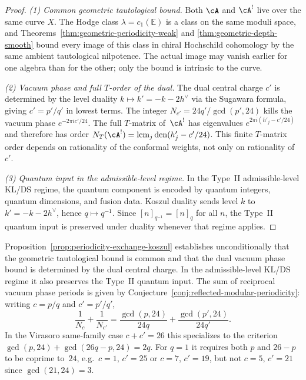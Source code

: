 \begin{proof}
\emph{(1) Common geometric tautological bound.}
Both $\cA$ and $\cA^!$ live over the same curve $X$. The Hodge class
$\lambda=c_1(\mathbb E)$ is a class on the same moduli space, and
Theorems~\ref{thm:geometric-periodicity-weak} and
\ref{thm:geometric-depth-smooth} bound every image of this class in
chiral Hochschild cohomology by the same ambient tautological
nilpotence. The actual image may vanish earlier for one algebra than
for the other; only the bound is intrinsic to the curve.

\emph{(2) Vacuum phase and full $T$-order of the dual.}
The dual central charge $c'$ is determined by the level duality
$k \mapsto k' = -k - 2h^\vee$ via the Sugawara formula, giving
$c'=p'/q'$ in lowest terms. The integer
$N_{c'}=24q'/\gcd(p',24)$ kills the vacuum phase
$e^{-2\pi i c'/24}$. The full $T$-matrix of~$\cA^!$ has eigenvalues
$e^{2\pi i(h'_j-c'/24)}$ and therefore has order
$N_T(\cA^!)=\operatorname{lcm}_j\operatorname{den}(h'_j-c'/24)$.
This finite $T$-matrix order depends on rationality of the conformal
weights, not only on rationality of~$c'$.

\emph{(3) Quantum input in the admissible-level regime.}
In the Type~II admissible-level KL/DS regime, the quantum component is
encoded by quantum integers, quantum dimensions, and fusion data.
Koszul duality sends level $k$ to $k' = -k - 2h^\vee$, hence
$q \mapsto q^{-1}$. Since $[n]_{q^{-1}} = [n]_q$ for all $n$, the
Type~II quantum input is preserved under duality whenever that regime
applies.
\end{proof}

\begin{remark}\label{rem:periodicity-exchange-harmonic}
Proposition~\ref{prop:periodicity-exchange-koszul} establishes
unconditionally that the geometric tautological bound is common and
that the dual vacuum phase bound is determined by the dual central
charge. In the admissible-level KL/DS regime it also preserves the
Type~II quantum input. The sum of reciprocal vacuum phase periods is given by
Conjecture~\ref{conj:reflected-modular-periodicity}: writing $c = p/q$
and $c' = p'/q'$,
\[
\frac{1}{N_c} + \frac{1}{N_{c'}}
= \frac{\gcd(p,24)}{24q}
 + \frac{\gcd(p',24)}{24q'}.
\]
In the Virasoro same-family case $c+c'=26$ this specializes to the
criterion
$\gcd(p,24)+\gcd(26q-p,24)=2q$. For $q=1$ it requires both $p$ and
$26-p$ to be coprime to~$24$, e.g.\ $c=1$, $c'=25$ or $c=7$,
$c'=19$, but not $c=5$, $c'=21$ since $\gcd(21,24)=3$.
\end{remark}



